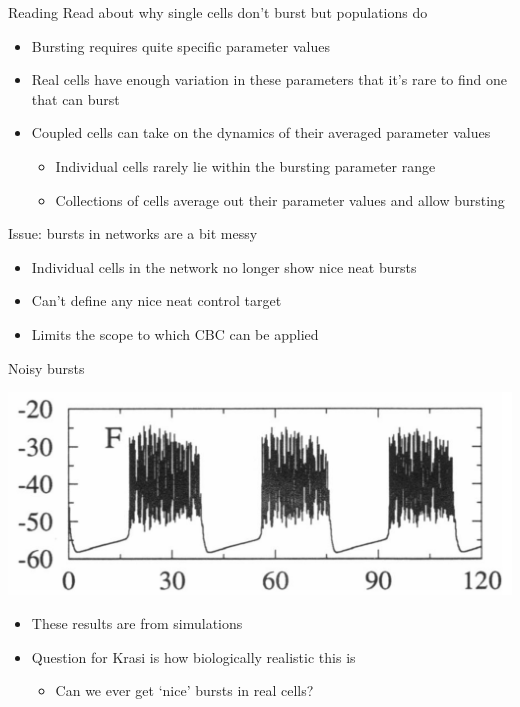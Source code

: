 \documentclass[presentation]{beamer}
\begin{document}
\begin{frame}[label={sec:orge41fcce}]{Reading}
Read about why single cells don't burst but populations do
\begin{itemize}
\item Bursting requires quite specific parameter values
\item Real cells have enough variation in these parameters that it's rare to find one that can burst
\item Coupled cells can take on the dynamics of their averaged parameter values
\begin{itemize}
\item Individual cells rarely lie within the bursting parameter range
\item Collections of cells average out their parameter values and allow bursting
\end{itemize}
\end{itemize}
\vfill
Issue: bursts in networks are a bit messy
\begin{itemize}
\item Individual cells in the network no longer show nice neat bursts
\item Can't define any nice neat control target
\item Limits the scope to which CBC can be applied
\end{itemize}
\end{frame}

\begin{frame}[label={sec:orgb11a5cc}]{Noisy bursts}
\begin{center}
\includegraphics[width=.9\linewidth]{./burst.png}
\end{center}
\vfill
\begin{itemize}
\item These results are from simulations
\item Question for Krasi is how biologically realistic this is
\begin{itemize}
\item Can we ever get `nice' bursts in real cells?
\end{itemize}
\end{itemize}
\end{frame}
\end{document}
